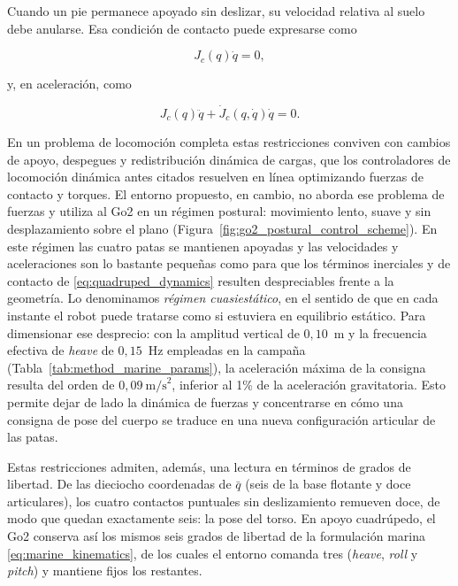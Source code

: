 \documentclass[12pt,a4paper]{report}
\begin{document}
Cuando un pie permanece apoyado sin deslizar, su velocidad relativa al suelo
debe anularse. Esa condición de contacto puede expresarse como

\begin{equation}
J_c(q)\dot{q} = 0,
\label{eq:contact_velocity_constraint}
\end{equation}

y, en aceleración, como

\begin{equation}
J_c(q)\ddot{q} + \dot{J}_c(q,\dot{q})\dot{q} = 0.
\label{eq:contact_acceleration_constraint}
\end{equation}

En un problema de locomoción completa estas restricciones conviven con cambios
de apoyo, despegues y redistribución dinámica de cargas, que los controladores de
locomoción dinámica antes citados resuelven en línea optimizando fuerzas de
contacto y torques. El entorno propuesto, en cambio, no aborda ese problema de
fuerzas y utiliza al Go2 en un régimen postural: movimiento lento, suave y sin
desplazamiento sobre el plano (Figura~\ref{fig:go2_postural_control_scheme}). En
este régimen las cuatro patas se mantienen apoyadas y las velocidades y
aceleraciones son lo bastante pequeñas como para que los términos inerciales y de
contacto de \eqref{eq:quadruped_dynamics} resulten despreciables frente a la
geometría. Lo denominamos \emph{régimen cuasiestático}, en el sentido de que en
cada instante el robot puede tratarse como si estuviera en equilibrio estático.
Para dimensionar ese desprecio: con la amplitud vertical de \(0{,}10\)~m y la
frecuencia efectiva de \emph{heave} de \(0{,}15\)~Hz empleadas en la campaña
(Tabla~\ref{tab:method_marine_params}), la aceleración máxima de la consigna
resulta del orden de \(0{,}09~\text{m/s}^2\), inferior al 1\% de la
aceleración gravitatoria.
Esto permite dejar de lado la dinámica de fuerzas y concentrarse en cómo una
consigna de pose del cuerpo se traduce en una nueva configuración articular de
las patas.

Estas restricciones admiten, además, una lectura en términos de grados de
libertad. De las dieciocho coordenadas de \(\bar q\) (seis de la base flotante
y doce articulares), los cuatro contactos puntuales sin deslizamiento remueven
doce, de modo que quedan exactamente seis: la pose del torso. En apoyo
cuadrúpedo, el Go2 conserva así los mismos seis grados de libertad de la
formulación marina \eqref{eq:marine_kinematics}, de los cuales el entorno
comanda tres (\emph{heave}, \emph{roll} y \emph{pitch}) y mantiene fijos los
restantes.
\end{document}
